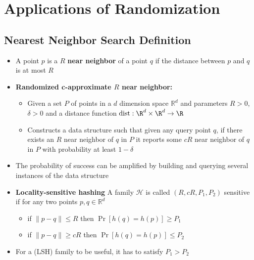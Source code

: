 \section{Applications of Randomization}
\subsection{Nearest Neighbor Search Definition}
\begin{itemize}
  \item A point $p$ is a $R$ \textbf{near neighbor} of a point $q$ if the distance between $p$ and $q$ is at most $R$
  \item \textbf{Randomized c-approximate $R$ near neighbor:} 
  \begin{itemize}
	  \item Given a set $P$ of points in a $d$ dimension space $\mathbb R^d$ and parameters $R > 0$, $\delta > 0$ and a distance function $\text{dist} : \R^d \times \R^d \to \R$
	  \item Constructs a data structure such that given any query point $q$, if there exists an $R$ near neighbor of $q$ in $P$ it reports some $cR$ near neighbor of $q$ in $P$ with probability at least $1- \delta$
  \end{itemize}
  \item The probability of success can be amplified by building and querying several instances of the data structure
  \item \textbf{Locality-sensitive hashing} A family $\mathcal H$ is called $(R, cR, P_1, P_2)$ sensitive if for any two points $p,q \in \mathbb R^d$
  \begin{itemize}
  	\item if $\|p-q \| \leq R$ then $\Pr[h(q) = h(p)] \geq P_1$ 
  	\item if $\|p-q \| \geq cR$ then $\Pr[h(q) = h(p)] \leq P_2$
  \end{itemize}
  \item For a (LSH) family to be useful, it has to satisfy $P_1 > P_2$
\end{itemize}

